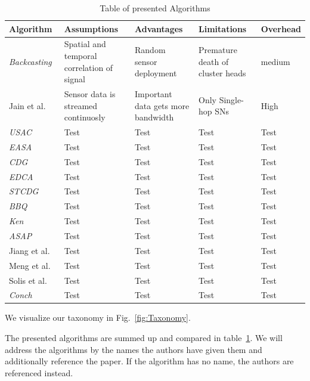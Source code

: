 \begin{table}[h]
\caption{Table of presented Algorithms \label{table:algorithm table}}
    \begin{tabular} { |p{3cm}||p{3cm}|p{3cm}|p{3cm}|p{3cm}| }

    \hline
    Algorithm& Assumptions & Advantages & Limitations & Overhead\\
    \hline

    \textit{Backcasting}~\cite{willett2004backcasting} & Spatial and temporal
    correlation of signal & Random sensor deployment & Premature death of
    cluster heads & medium\\

    Jain et al.~\cite{jain2004adaptive} & Sensor data is streamed continuosly &
    Important data gets more bandwidth & Only Single-hop \acp{SN} & High\\

    \textit{USAC}~\cite{padhy2006utility}& Test & Test & Test & Test\\

    \textit{EASA}~\cite{srbinovski2016energy}& Test & Test & Test & Test\\
    \textit{CDG}~\cite{luo2009compressive}& Test & Test & Test & Test\\
    \textit{EDCA}~\cite{cheng2010efficient}& Test & Test & Test & Test\\
    \textit{STCDG}~\cite{cheng2013stcdg}& Test & Test & Test & Test\\
    \textit{BBQ}~\cite{deshpande2004model}& Test & Test & Test & Test\\
    \textit{Ken}~\cite{chu2006approximate}& Test & Test & Test & Test\\
    \textit{ASAP}~\cite{gedik2007asap}& Test & Test & Test & Test\\
    Jiang et al.~\cite{jiang2011prediction}& Test & Test & Test & Test\\
    Meng et al.~\cite{meng2004event}& Test & Test & Test & Test\\
    Solis et al.~\cite{solis2005efficient}& Test & Test & Test & Test\\
    \textit{Conch}~\cite{silberstein2006constraint}& Test & Test & Test & Test\\
    \hline
    \end{tabular}
\end{table}

We visualize our taxonomy in Fig.~\ref{fig:Taxonomy}.

The presented algorithms are summed up and compared in
table~\ref{table:algorithm table}. We will address the algorithms by the names
the authors have given them and additionally reference the paper. If the
algorithm has no name, the authors are referenced instead.

